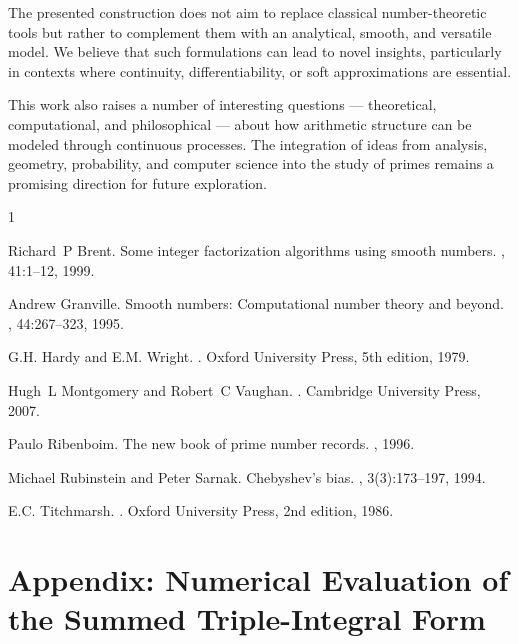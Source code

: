 \documentclass[12pt]{article}
\theoremstyle{definition}
\theoremstyle{plain}
\theoremstyle{remark}
\begin{document}
The presented construction does not aim to replace classical number-theoretic tools but rather to complement them with an analytical, smooth, and versatile model. We believe that such formulations can lead to novel insights, particularly in contexts where continuity, differentiability, or soft approximations are essential.

This work also raises a number of interesting questions — theoretical, computational, and philosophical — about how arithmetic structure can be modeled through continuous processes. The integration of ideas from analysis, geometry, probability, and computer science into the study of primes remains a promising direction for future exploration.

% 
% 

\begin{thebibliography}{1}

Richard~P Brent.
\newblock Some integer factorization algorithms using smooth numbers.
, 41:1--12, 1999.

Andrew Granville.
\newblock Smooth numbers: Computational number theory and beyond.
, 44:267--323, 1995.

G.H. Hardy and E.M. Wright.
.
\newblock Oxford University Press, 5th edition, 1979.

Hugh~L Montgomery and Robert~C Vaughan.
.
\newblock Cambridge University Press, 2007.

Paulo Ribenboim.
\newblock The new book of prime number records.
, 1996.

Michael Rubinstein and Peter Sarnak.
\newblock Chebyshev's bias.
, 3(3):173--197, 1994.

E.C. Titchmarsh.
.
\newblock Oxford University Press, 2nd edition, 1986.

\end{thebibliography}


\clearpage
\appendix
\section{Appendix: Numerical Evaluation of the Summed Triple-Integral Form}
\end{document}
